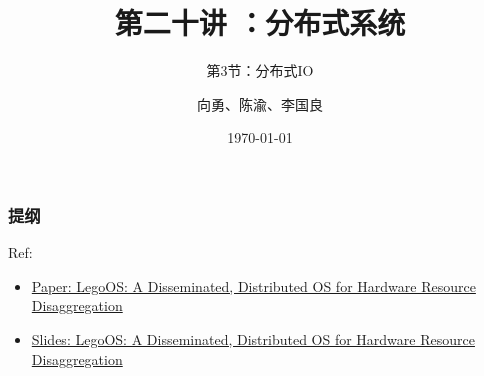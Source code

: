 


\title[第19讲]{第二十讲 ：分布式系统} %
\subtitle{第3节：分布式IO}
\author{向勇、陈渝、李国良} %
\date{\today} %


    
\begin{frame}
    \titlepage %
\end{frame}

\begin{frame}
    \frametitle{提纲} %
    \tableofcontents %
    
    Ref:
        \begin{itemize}
            \item \href{https://www.usenix.org/system/files/osdi18-shan.pdf}{Paper: LegoOS: A Disseminated, Distributed OS for Hardware Resource Disaggregation}
            \item \href{https://www.usenix.org/sites/default/files/conference/protected-files/osdi18_slides_shan.pdf}{Slides: LegoOS: A Disseminated, Distributed OS for Hardware Resource Disaggregation}
        \end{itemize}
    
\end{frame}
